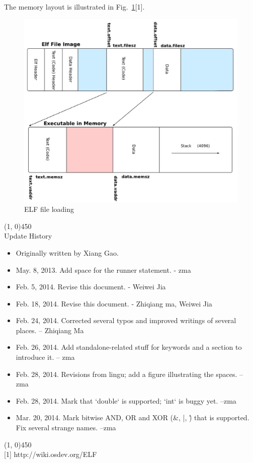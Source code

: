 \documentclass[a4paper]{article}
\begin{document}
The memory layout is illustrated in Fig.~\ref{fig:c0-elf}[1].\\

\begin{figure}[htbp]
\begin{center}
  \includegraphics[width=5.8in]{figure/elf.eps}
  \caption{ELF file loading}
  \label{fig:c0-elf}
\end{center}
\end{figure}


\line(1, 0){450}\\

Update History\\
\begin{itemize}
	\item Originally written by Xiang Gao.
	\item May. 8, 2013. Add space for the runner statement. - zma
	\item Feb. 5, 2014. Revise this document. - Weiwei Jia
	\item Feb. 18, 2014. Revise this document. - Zhiqiang ma, Weiwei Jia
	\item Feb. 24, 2014. Corrected several typos and improved writings of several places. – Zhiqiang Ma
	\item Feb. 26, 2014. Add standalone-related stuff for keywords and a section to introduce it. – zma
	\item Feb. 28, 2014. Revisions from lingu; add a figure illustrating the spaces. – zma
	\item Feb. 28, 2014. Mark that `double` is supported; `int` is buggy yet. –zma
	\item Mar. 20, 2014. Mark bitwise AND, OR and XOR (\&, |, \^) that is supported. Fix several strange names. –zma
\end{itemize}

\line(1, 0){450}\\

[1] http://wiki.osdev.org/ELF
\end{document}
